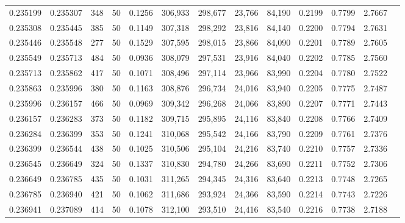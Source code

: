 \begin{tabular}{rrrrrrrrrrrrr}
0.235199 & 0.235307 &   348 &  50 &                                     0.1256 & 306,933 & 298,677 &  23,766 &  84,190 & 0.2199 & 0.7799 & 2.7667 \\
0.235308 & 0.235445 &   385 &  50 &                                     0.1149 & 307,318 & 298,292 &  23,816 &  84,140 & 0.2200 & 0.7794 & 2.7631 \\
0.235446 & 0.235548 &   277 &  50 &                                     0.1529 & 307,595 & 298,015 &  23,866 &  84,090 & 0.2201 & 0.7789 & 2.7605 \\
0.235549 & 0.235713 &   484 &  50 &                                     0.0936 & 308,079 & 297,531 &  23,916 &  84,040 & 0.2202 & 0.7785 & 2.7560 \\
0.235713 & 0.235862 &   417 &  50 &                                     0.1071 & 308,496 & 297,114 &  23,966 &  83,990 & 0.2204 & 0.7780 & 2.7522 \\
0.235863 & 0.235996 &   380 &  50 &                                     0.1163 & 308,876 & 296,734 &  24,016 &  83,940 & 0.2205 & 0.7775 & 2.7487 \\
0.235996 & 0.236157 &   466 &  50 &                                     0.0969 & 309,342 & 296,268 &  24,066 &  83,890 & 0.2207 & 0.7771 & 2.7443 \\
0.236157 & 0.236283 &   373 &  50 &                                     0.1182 & 309,715 & 295,895 &  24,116 &  83,840 & 0.2208 & 0.7766 & 2.7409 \\
0.236284 & 0.236399 &   353 &  50 &                                     0.1241 & 310,068 & 295,542 &  24,166 &  83,790 & 0.2209 & 0.7761 & 2.7376 \\
0.236399 & 0.236544 &   438 &  50 &                                     0.1025 & 310,506 & 295,104 &  24,216 &  83,740 & 0.2210 & 0.7757 & 2.7336 \\
0.236545 & 0.236649 &   324 &  50 &                                     0.1337 & 310,830 & 294,780 &  24,266 &  83,690 & 0.2211 & 0.7752 & 2.7306 \\
0.236649 & 0.236785 &   435 &  50 &                                     0.1031 & 311,265 & 294,345 &  24,316 &  83,640 & 0.2213 & 0.7748 & 2.7265 \\
0.236785 & 0.236940 &   421 &  50 &                                     0.1062 & 311,686 & 293,924 &  24,366 &  83,590 & 0.2214 & 0.7743 & 2.7226 \\
0.236941 & 0.237089 &   414 &  50 &                                     0.1078 & 312,100 & 293,510 &  24,416 &  83,540 & 0.2216 & 0.7738 & 2.7188 \\

\end{tabular}
